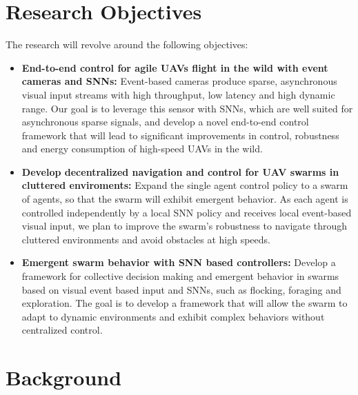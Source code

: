 \documentclass{article}
\begin{document}
\section{Research Objectives}
The research will revolve around the following objectives:    
\begin{itemize}
    \item \textbf{End-to-end control for agile UAVs flight in the wild with event cameras and SNNs:}
    Event-based cameras produce sparse, asynchronous visual input streams with high throughput, low latency and high dynamic range. Our goal is to leverage this sensor with SNNs, which are well suited for asynchronous sparse signals, and develop a novel end-to-end control framework that will lead to significant improvements in control, robustness and energy consumption of high-speed UAVs in the wild.
          
    \item \textbf{Develop decentralized navigation and control for UAV swarms in cluttered enviroments:} 
    Expand the single agent control policy to a swarm of agents, so that the swarm will exhibit emergent behavior. As each agent is controlled independently by a local SNN policy and receives local event-based visual input, we plan to improve the swarm's robustness to navigate through cluttered environments and avoid obstacles at high speeds.
            
    \item \textbf{Emergent swarm behavior with SNN based controllers:}
    Develop a framework for collective decision making and emergent behavior in swarms based on visual event based input and SNNs, such as flocking, foraging and exploration. The goal is to develop a framework that will allow the swarm to adapt to dynamic environments and exhibit complex behaviors without centralized control.
\end{itemize}

\section{Background}
\end{document}
